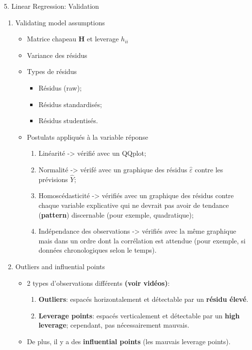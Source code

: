 \documentclass[12pt, titlepage, french]{report}
\begin{document}
\begin{CHPT_SUMM}{5. Linear Regression:  Validation}
\begin{enumerate}
	\item	Validating model assumptions
	\begin{itemize}
		\item	Matrice chapeau $\bm{H}$ et leverage $h_{ii}$
		\item	Variance des résidus
		\item	Types de résidus
		\begin{itemize}
			\item	Résidus (raw);
			\item	Résidus standardisés;
			\item	Résidus studentisés.
		\end{itemize}
		\item	Postulats appliqués à la variable réponse
		\begin{enumerate}
			\item	Linéarité -> vérifié avec un QQplot;
			\item	Normalité -> vérifé avec un graphique des résidus $\hat{\varepsilon}$ contre les prévisions $\hat{Y}$;
			\item	Homoscédasticité -> vérifiés avec un graphique des résidus contre chaque variable explicative qui ne devrait pas avoir de tendance (\textbf{pattern}) discernable (pour exemple, quadratique);
			\item	Indépendance des observations -> vérifiés avec la même graphique mais dans un ordre dont la corrélation est attendue (pour exemple, si données chronologiques selon le temps).
		\end{enumerate}
	\end{itemize}
	\item	Outliers and influential points
	\begin{itemize}
		\item	2 types d'observations différents \textbf{(voir vidéos)}:
		\begin{enumerate}
			\item	\textbf{Outliers}: espacés horizontalement et détectable par un \textbf{résidu élevé}.
			\item	\textbf{Leverage points}: espacés verticalement et détectable par un \textbf{high leverage}; cependant, pas nécessairement mauvais.
		\end{enumerate}
		\item	De plus, il y a des \textbf{influential points} (les mauvais leverage points).

\end{itemize}
\end{enumerate}
\end{CHPT_SUMM}
\end{document}
